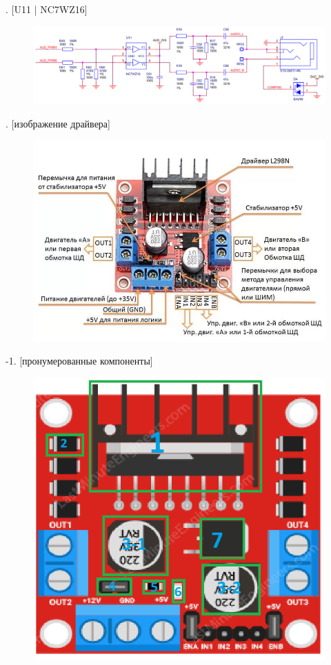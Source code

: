 . [U11 | NC7WZ16]
\begin{figure}[H]
  \centering
  \includegraphics[width=\textwidth]{img/U11.pdf}
\end{figure}




. [изображение драйвера]
\begin{figure}[H]
  \centering
  \includegraphics[width=\textwidth]{img/L298N/L298N_simple.png}
\end{figure}

-1. [пронумерованные компоненты]
\begin{figure}[H]
  \centering
  \includegraphics[width=\textwidth]{img/L298N/L298N_numbers.png}
\end{figure}

